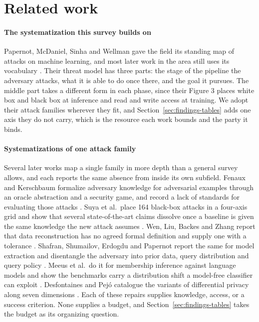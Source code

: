 \section{Related work}
\label{sec:related}

\paragraph{The systematization this survey builds on}
Papernot, McDaniel, Sinha and Wellman gave the field its standing map of attacks on
machine learning, and most later work in the area still uses its vocabulary
\cite{PMSW18}. Their threat model has three parts: the stage of the pipeline the
adversary attacks, what it is able to do once there, and the goal it pursues. The
middle part takes a different form in each phase, since their Figure 3 places white
box and black box at inference and read and write access at training. We adopt their
attack families wherever they fit, and Section~\ref{sec:findings-tables} adds one axis they
do not carry, which is the resource each work bounds and the party it binds.

\paragraph{Systematizations of one attack family}
Several later works map a single family in more depth than a general survey allows,
and each reports the same absence from inside its own subfield. Fenaux and
Kerschbaum formalize adversary knowledge for adversarial examples through an oracle
abstraction and a security game, and record a lack of standards for evaluating those
attacks \cite{FK24}. Suya et al.\ place 164 black-box attacks in a four-axis grid and
show that several state-of-the-art claims dissolve once a baseline is given the same
knowledge the new attack assumes \cite{SSZHTE24}. Wen, Liu, Backes and Zhang report
that data reconstruction has no agreed formal definition and supply one with a
tolerance \cite{WLBZ25}. Shafran, Shumailov, Erdogdu and Papernot report the same for
model extraction and disentangle the adversary into prior data, query distribution
and query policy \cite{SSEP24}. Meeus et al.\ do it for membership inference against
language models and show the benchmarks carry a distribution shift a model-free
classifier can exploit \cite{MSJFRM25}. Desfontaines and Pej\'o catalogue the
variants of differential privacy along seven dimensions \cite{DP20}. Each of these
repairs supplies knowledge, access, or a success criterion. None supplies a budget,
and Section~\ref{sec:findings-tables} takes the budget as its organizing question.

